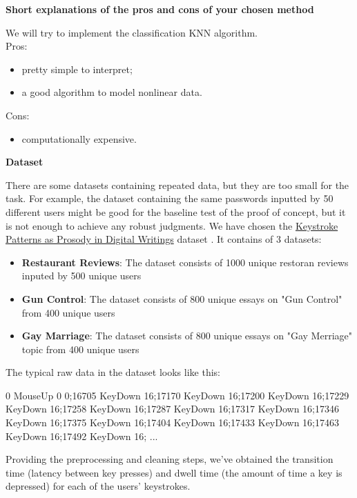 \documentclass[12pt,a4]{article}
\begin{document}
\newpage
\bigskip
\large\textbf{Short explanations of the pros and cons of your chosen method}
\bigskip

\normalsize
We will try to implement the classification KNN algorithm.\\
Pros:
\begin{itemize}
    \item pretty simple to interpret;
    \item a good algorithm to model nonlinear data. 
\end{itemize}


Cons:
\begin{itemize}
    \item computationally expensive. 
\end{itemize}



\bigskip
\large\textbf{Dataset}
\bigskip

\normalsize
There are some datasets containing repeated data, but they are too small for the task. For example, the dataset containing the same passwords inputted by 50 different users might be good for the baseline test of the proof of concept, but it is not enough to achieve any robust judgments.
We have chosen the  \href{http://www3.cs.stonybrook.edu/~rbanerjee/project-pages/keystrokes/keystrokes.html}{Keystroke Patterns as Prosody in Digital Writings} dataset \cite{banerjee2014_emnlp}. It contains of 3 datasets: \begin{itemize}
	\item \textbf{Restaurant Reviews}: The dataset consists of 1000 unique restoran reviews inputed by 500 unique users
	\item \textbf{Gun Control}: The dataset consists of 800 unique essays on "Gun Control" from 400 unique users
	\item \textbf{Gay Marriage}: The dataset consists of 800 unique essays on "Gay Merriage" topic  from 400 unique users
\end{itemize}

The typical raw data in the dataset looks like this:
\bigskip

\begin{text}
	0 MouseUp 0 0;16705 KeyDown 16;17170 KeyDown 16;17200 KeyDown 16;17229 KeyDown 16;17258 KeyDown 16;17287 KeyDown 16;17317 KeyDown 16;17346 KeyDown 16;17375 KeyDown 16;17404 KeyDown 16;17433 KeyDown 16;17463 KeyDown 16;17492 KeyDown 16; ...
\end{text}

Providing the preprocessing and cleaning steps, we've obtained the transition time (latency between key presses) and dwell time (the amount of time a key is depressed) for each of the users' keystrokes.
\end{document}
